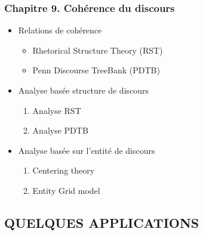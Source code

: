 \documentclass[11pt, a4paper]{article}
\begin{document}
\begin{tcolorbox}
\subsubsection*{Chapitre 9. Cohérence du discours}

\begin{multicols}{2}
	\begin{itemize}
	
		\item Relations de cohérence
		\begin{itemize}
			\item Rhetorical Structure Theory (RST)
			\item Penn Discourse TreeBank (PDTB)
		\end{itemize}
	
		\item Analyse basée structure de discours
		\begin{enumerate}
			\item Analyse RST
			\item Analyse PDTB
		\end{enumerate}
	
		\item Analyse basée sur l'entité de discours
		\begin{enumerate}
			\item Centering theory
			\item Entity Grid model
		\end{enumerate}
		
	\end{itemize}
\end{multicols}
\end{tcolorbox}

\subsection*{\uppercase{Quelques applications}}
\end{document}
